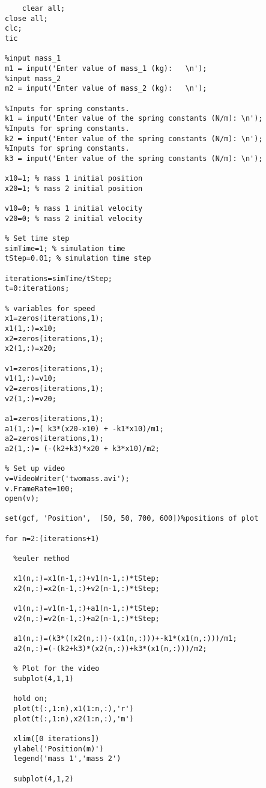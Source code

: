 \newpage

\begin{framed}
\begin{verbatim}
    clear all; 
close all;
clc;
tic

%input mass_1
m1 = input('Enter value of mass_1 (kg):   \n');
%input mass_2
m2 = input('Enter value of mass_2 (kg):   \n');

%Inputs for spring constants.
k1 = input('Enter value of the spring constants (N/m): \n');
%Inputs for spring constants.
k2 = input('Enter value of the spring constants (N/m): \n');
%Inputs for spring constants.
k3 = input('Enter value of the spring constants (N/m): \n');

x10=1; % mass 1 initial position 
x20=1; % mass 2 initial position 

v10=0; % mass 1 initial velocity 
v20=0; % mass 2 initial velocity 

% Set time step 
simTime=1; % simulation time 
tStep=0.01; % simulation time step

iterations=simTime/tStep;
t=0:iterations;

% variables for speed
x1=zeros(iterations,1);
x1(1,:)=x10;
x2=zeros(iterations,1);
x2(1,:)=x20;

v1=zeros(iterations,1);
v1(1,:)=v10;
v2=zeros(iterations,1);
v2(1,:)=v20;

a1=zeros(iterations,1);
a1(1,:)=( k3*(x20-x10) + -k1*x10)/m1;
a2=zeros(iterations,1);
a2(1,:)= (-(k2+k3)*x20 + k3*x10)/m2;

% Set up video
v=VideoWriter('twomass.avi');
v.FrameRate=100;
open(v);

set(gcf, 'Position',  [50, 50, 700, 600])%positions of plot

for n=2:(iterations+1)
    
  %euler method
    
  x1(n,:)=x1(n-1,:)+v1(n-1,:)*tStep;
  x2(n,:)=x2(n-1,:)+v2(n-1,:)*tStep;
  
  v1(n,:)=v1(n-1,:)+a1(n-1,:)*tStep;
  v2(n,:)=v2(n-1,:)+a2(n-1,:)*tStep;
  
  a1(n,:)=(k3*((x2(n,:))-(x1(n,:)))+-k1*(x1(n,:)))/m1;
  a2(n,:)=(-(k2+k3)*(x2(n,:))+k3*(x1(n,:)))/m2;

  % Plot for the video
  subplot(4,1,1)
  
  hold on;
  plot(t(:,1:n),x1(1:n,:),'r')
  plot(t(:,1:n),x2(1:n,:),'m')
  
  xlim([0 iterations])
  ylabel('Position(m)')
  legend('mass 1','mass 2')
  
  subplot(4,1,2)
  

\end{verbatim}
\end{framed}
